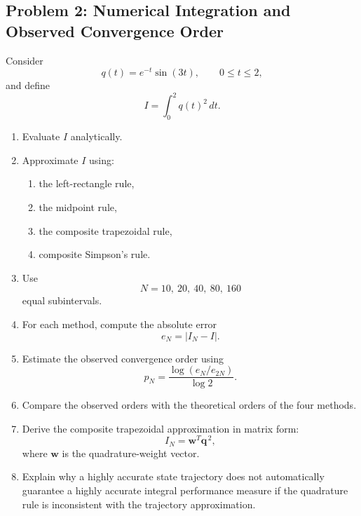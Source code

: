 \subsection*{Problem 2: Numerical Integration and Observed Convergence Order}

Consider
\begin{equation}
q(t)
=
e^{-t}\sin(3t),
\qquad
0\leq t\leq2,
\end{equation}
and define
\begin{equation}
I
=
\int_0^2 q(t)^2\,dt.
\end{equation}

\begin{enumerate}
    \item Evaluate $I$ analytically.

    \item Approximate $I$ using:
    \begin{enumerate}
        \item the left-rectangle rule,
        \item the midpoint rule,
        \item the composite trapezoidal rule,
        \item composite Simpson's rule.
    \end{enumerate}

    \item Use
    \begin{equation}
    N=10,\ 20,\ 40,\ 80,\ 160
    \end{equation}
    equal subintervals.

    \item For each method, compute the absolute error
    \begin{equation}
    e_N
    =
    |I_N-I|.
    \end{equation}

    \item Estimate the observed convergence order using
    \begin{equation}
    p_N
    =
    \frac{
    \log(e_N/e_{2N})
    }{
    \log 2
    }.
    \end{equation}

    \item Compare the observed orders with the theoretical orders of the four
    methods.

    \item Derive the composite trapezoidal approximation in matrix form:
    \begin{equation}
    I_N
    =
    \mathbf{w}^T\mathbf{q}^{\,2},
    \end{equation}
    where $\mathbf{w}$ is the quadrature-weight vector.

    \item Explain why a highly accurate state trajectory does not
    automatically guarantee a highly accurate integral performance measure
    if the quadrature rule is inconsistent with the trajectory
    approximation.
\end{enumerate}


